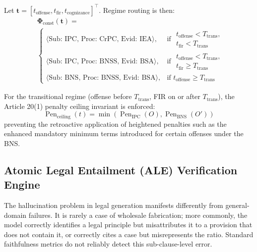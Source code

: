 \documentclass[conference]{IEEEtran}
\begin{document}
Let $\mathbf{t} = [t_{\text{offense}}, t_{\text{fir}}, t_{\text{cognizance}}]^\top$. Regime routing is then:
\begin{equation}
\begin{aligned}
&\mathbf{\Phi}_{\text{const}}(\mathbf{t}) = \\
&\begin{cases}
\langle \text{Sub: IPC, Proc: CrPC, Evid: IEA} \rangle, & \text{if } \substack{t_{\text{offense}} < T_{\text{trans}}, \\ t_{\text{fir}} < T_{\text{trans}}} \\[8pt]
\langle \text{Sub: IPC, Proc: BNSS, Evid: BSA} \rangle, & \text{if } \substack{t_{\text{offense}} < T_{\text{trans}}, \\ t_{\text{fir}} \ge T_{\text{trans}}} \\[6pt]
\langle \text{Sub: BNS, Proc: BNSS, Evid: BSA} \rangle, & \text{if } t_{\text{offense}} \ge T_{\text{trans}}
\end{cases}
\end{aligned}
\end{equation}

For the transitional regime (offense before $T_{\text{trans}}$, FIR on or after $T_{\text{trans}}$), the Article 20(1) penalty ceiling invariant is enforced:
\begin{equation}
\operatorname{Pen}_{\text{ceiling}}(t) = \min\left(\operatorname{Pen}_{\text{IPC}}(O), \operatorname{Pen}_{\text{BNS}}(O')\right)
\end{equation}
preventing the retroactive application of heightened penalties such as the enhanced mandatory minimum terms introduced for certain offenses under the BNS.

\subsection{Atomic Legal Entailment (ALE) Verification Engine}
The hallucination problem in legal generation manifests differently from general-domain failures. It is rarely a case of wholesale fabrication; more commonly, the model correctly identifies a legal principle but misattributes it to a provision that does not contain it, or correctly cites a case but misrepresents the ratio. Standard faithfulness metrics do not reliably detect this sub-clause-level error.
\end{document}
